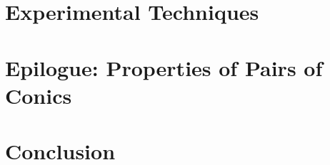 \documentclass{book}
\begin{document}
\chapter{Experimental Techniques}
\label{chap:08-experimental}
%

\chapter{Epilogue: Properties of Pairs of Conics}
\label{chap:09-conics}
%

\chapter{Conclusion}
\label{chap:10-conclusion}
%

\appendix
% 

%

\backmatter

\sloppy
\printbibliography


\end{document}
